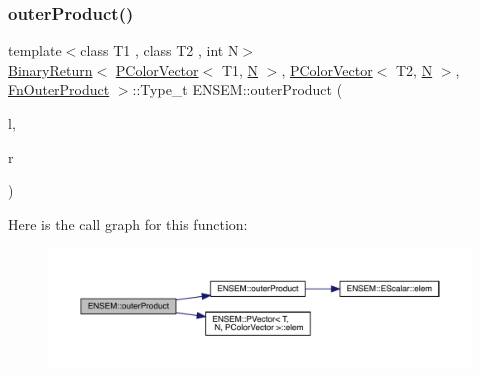 \subsubsection{\texorpdfstring{outerProduct()}{outerProduct()}}
{\footnotesize\ttfamily template$<$class T1 , class T2 , int N$>$ \\
\mbox{\hyperlink{structENSEM_1_1BinaryReturn}{Binary\+Return}}$<$ \mbox{\hyperlink{classENSEM_1_1PColorVector}{P\+Color\+Vector}}$<$ T1, \mbox{\hyperlink{adat__devel_2lib_2hadron_2operator__name__util_8cc_a7722c8ecbb62d99aee7ce68b1752f337}{N}} $>$, \mbox{\hyperlink{classENSEM_1_1PColorVector}{P\+Color\+Vector}}$<$ T2, \mbox{\hyperlink{adat__devel_2lib_2hadron_2operator__name__util_8cc_a7722c8ecbb62d99aee7ce68b1752f337}{N}} $>$, \mbox{\hyperlink{structENSEM_1_1FnOuterProduct}{Fn\+Outer\+Product}} $>$\+::Type\+\_\+t E\+N\+S\+E\+M\+::outer\+Product (\begin{DoxyParamCaption}\item[{const \mbox{\hyperlink{classENSEM_1_1PColorVector}{P\+Color\+Vector}}$<$ T1, \mbox{\hyperlink{adat__devel_2lib_2hadron_2operator__name__util_8cc_a7722c8ecbb62d99aee7ce68b1752f337}{N}} $>$ \&}]{l,  }\item[{const \mbox{\hyperlink{classENSEM_1_1PColorVector}{P\+Color\+Vector}}$<$ T2, \mbox{\hyperlink{adat__devel_2lib_2hadron_2operator__name__util_8cc_a7722c8ecbb62d99aee7ce68b1752f337}{N}} $>$ \&}]{r }\end{DoxyParamCaption})\hspace{0.3cm}{\ttfamily [inline]}}

Here is the call graph for this function\+:\nopagebreak
\begin{figure}[H]
\begin{center}
\leavevmode
\includegraphics[width=350pt]{dd/d2f/group__primcolormatrix_ga4f0b21163125568ab5bcbbef75a17973_cgraph}
\end{center}
\end{figure}
\mbox{\label{group__primcolormatrix_ga44a6b0393ecffb0c4aecc93b45a8d12d}} 
